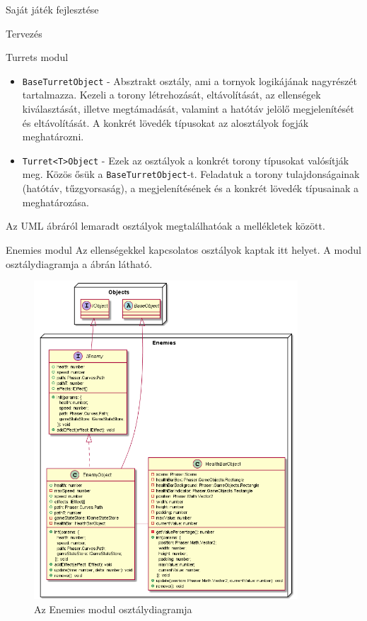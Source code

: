 \begin{MyChapter}{Saját játék fejlesztése}
\begin{MySection}{Tervezés}
\begin{MySubSection}{Turrets modul}
\begin{itemize}
				\item \texttt{BaseTurretObject} - Absztrakt osztály, ami a tornyok logikájának nagyrészét tartalmazza. Kezeli a torony létrehozását, eltávolítását, az ellenségek kiválasztását, illetve megtámadását, valamint a hatótáv jelölő megjelenítését és eltávolítását. A konkrét lövedék típusokat az alosztályok fogják meghatározni.
				
				\item \texttt{Turret<T>Object} - Ezek az osztályok a konkrét torony típusokat valósítják meg. Közös ősük a \texttt{BaseTurretObject}-t. Feladatuk a torony tulajdonságainak (hatótáv, tűzgyorsaság), a megjelenítésének és a konkrét lövedék típusainak a meghatározása.
				
			\end{itemize}
			
			Az UML ábráról lemaradt osztályok megtalálhatóak a mellékletek között.
		\end{MySubSection}

		\begin{MySubSection}{Enemies modul}
			Az ellenségekkel kapcsolatos osztályok kaptak itt helyet.
			A modul osztálydiagramja a  ábrán látható.
				
			\begin{figure}[h!]
				\centering
				\includegraphics[width=0.88\textwidth]{kepek/uml/enemies/enemy.png}
				\caption{Az Enemies modul osztálydiagramja}
				\label{fig:uml:enemy}
			\end{figure}
			

\end{MySubSection}
\end{MySection}
\end{MyChapter}
